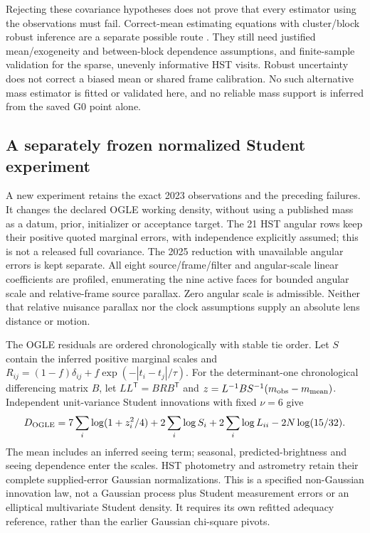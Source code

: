 Rejecting these covariance hypotheses does not prove that every estimator using
the observations must fail. Correct-mean estimating equations with cluster/block
robust inference are a separate possible route \cite{LiangZeger1986,CameronMiller2015}.
They still need justified mean/exogeneity and between-block dependence assumptions,
and finite-sample validation for the sparse, unevenly informative HST visits.
Robust uncertainty does not correct a biased mean or shared frame calibration.
No such alternative mass estimator is fitted or validated here, and no reliable
mass support is inferred from the saved G0 point alone.

\subsection{A separately frozen normalized Student experiment}
\label{sec:student-known-system}
A new experiment retains the exact 2023 observations and the preceding
failures. It changes the declared OGLE working density, without using a
published mass as a datum, prior, initializer or acceptance target. The
21 HST angular rows keep their positive quoted marginal errors, with
independence explicitly assumed; this is not a released full covariance.
The 2025 reduction with unavailable angular errors is kept separate.
All eight source/frame/filter and angular-scale linear coefficients are
profiled, enumerating the nine active faces for bounded angular scale and
relative-frame source parallax. Zero angular scale is admissible. Neither
that relative nuisance parallax nor the clock assumptions supply an
absolute lens distance or motion.

The OGLE residuals are ordered chronologically with stable tie order.
Let $S$ contain the inferred positive marginal scales and
$R_{ij}=(1-f)\delta_{ij}+f\exp(-|t_i-t_j|/\tau)$.
For the determinant-one chronological differencing matrix $B$, let
$LL^{\mathsf T}=BRB^{\mathsf T}$ and
$z=L^{-1}BS^{-1}(m_{\rm obs}-m_{\rm mean})$.
Independent unit-variance Student innovations with fixed $\nu=6$ give
\begin{equation}
 D_{\rm OGLE}=7\sum_i\log(1+z_i^2/4)
 +2\sum_i\log S_i+2\sum_i\log L_{ii}
 -2N\log(15/32).
 \label{eq:student-known-normalization}
\end{equation}
The mean includes an inferred seeing term; seasonal, predicted-brightness
and seeing dependence enter the scales. HST photometry and astrometry
retain their complete supplied-error Gaussian normalizations. This is
a specified non-Gaussian innovation law, not a Gaussian process plus
Student measurement errors or an elliptical multivariate Student density.
It requires its own refitted adequacy reference, rather than the earlier
Gaussian chi-square pivots.

